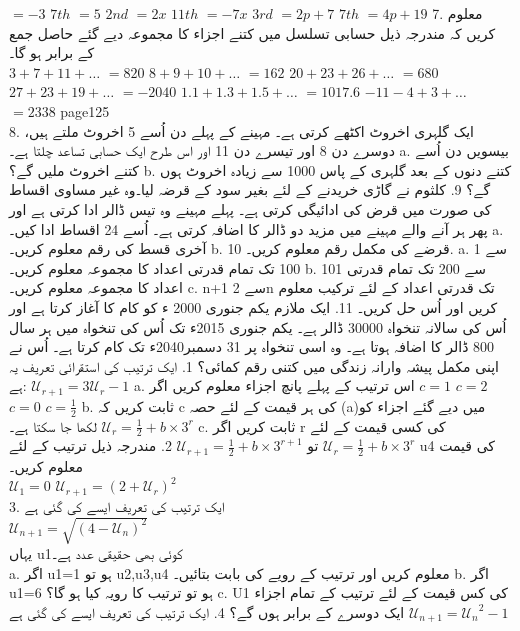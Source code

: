 \(=-3\)
\(7th\)
\(=5\)
\(2nd\)
\(=2x\)
\(11th\)
\(=-7x\)
\(3rd\)
\(=2p+7\)
\(7th\)
\(=4p+19\)
7.	معلوم کریں کہ مندرجہ ذیل حسابی تسلسل میں کتنے اجزاء کا مجموعہ دیے گئے حاصل جمع کے برابر ہو گا۔\\
\(3+7+11+\dotsc\)
\(=820\)
\(8+9+10+\dotsc\)
\(=162\)
\(20+23+26+\dotsc\)
\(=680\)
\(27+23+19+\dotsc\)
\(=-2040\)
\(1.1+1.3+1.5+\dotsc\)
\(=1017.6\)
\(-11-4+3+\dotsc\)
\(=2338\)
\clearpage
page125\\
8.	ایک گلہری اخروٹ اکٹھے کرتی ہے۔ مہینے کے پہلے دن اُسے 5 اخروٹ ملتے ہیں، دوسرے دن 8 اور تیسرے دن 11 اور اس طرح ایک حسابی تساعد چلتا ہے۔
a.	بیسویں دن اُسے کتنے اخروٹ ملیں گے؟
b.	کتنے دنوں کے بعد گلہری کے پاس 1000 سے زیادہ اخروٹ ہوں گے؟
9.	کلثوم نے گاڑی خریدنے کے لئے بغیر سود کے قرضہ لیا۔وہ غیر مساوی اقساط کی صورت میں قرض کی ادائیگی کرتی ہے۔ پہلے مہینے وہ تیس ڈالر ادا کرتی ہے اور پھر ہر آنے والے مہینے میں مزید دو ڈالر کا اضافہ کرتی ہے۔ اُسے 24 اقساط ادا کیں۔
a.	آخری قسط کی رقم معلوم کریں۔
b.	قرضے کی مکمل رقم معلوم کریں۔
10.	
a.	1 سے 100 تک تمام قدرتی اعداد کا مجموعہ معلوم کریں۔
b.	101 سے 200 تک تمام قدرتی اعداد کا مجموعہ معلوم کریں۔
c.	n+1 سے 2n تک قدرتی اعداد کے لئے ترکیب معلوم کریں اور اُس حل کریں۔
11.	ایک ملازم یکم جنوری 2000 ء کو کام کا آغاز کرتا ہے اور اُس کی سالانہ تنخواہ 30000 ڈالر ہے۔ یکم جنوری 2015ء تک اُس کی تنخواہ میں ہر سال 800 ڈالر کا اضافہ ہوتا ہے۔ وہ اسی تنخواہ پر 31 دسمبر2040ء تک کام کرتا ہے۔ اُس نے اپنی مکمل پیشہ وارانہ زندگی میں کتنی رقم کمائی؟
1.	ایک ترتیب کی استقرائی تعریف یہ ہے:
\(\mathcal {U}_{r+1}=3\mathcal{U}_r-1\)
a.
اس ترتیب کے پہلے پانچ اجزاء معلوم کریں اگر
\(c=1\)
\(c=2\)
\(c=0\)
\(c=\frac{1}{2}\)
b.
ثابت کریں کہ c کی ہر قیمت کے لئے حصہ (a)میں دیے گئے اجزاء کو
\(\mathcal{U}_r=\frac{1}{2}+b\times3^r\)
  لکھا جا سکتا ہے۔
c.
ثابت کریں اگر r کی کسی قیمت کے لئے
\(\mathcal{U}_r=\frac{1}{2}+b\times3^r\)
تو
\(\mathcal{U}_{r+1}=\frac{1}{2}+b\times3^{r+1}\)
2.	مندرجہ ذیل ترتیب کے لئے u4 کی قیمت معلوم کریں۔\\
\(\mathcal{U}_1=0\)
\(\mathcal{U}_{r+1}=(2+\mathcal{U}_r)^2\)\\
3.	ایک ترتیب کی تعریف ایسے کی گئی ہے\\
\(\mathcal{U}_{n+1}=\sqrt{({4}-{\mathcal{U}_n})^2}\)\\
یہاں  u1کوئی بھی حقیقی عدد ہے۔\\
a.	اگر u1=1 ہو تو u2,u3,u4 معلوم کریں اور ترتیب کے رویے کی بابت بتائیں۔
b.	اگر u1=6 ہو تو ترتیب کا رویہ کیا ہو گا؟
c.	U1 کی کس قیمت کے لئے ترتیب کے تمام اجزاء ایک دوسرے کے برابر ہوں گے؟
4.	ایک ترتیب کی تعریف ایسے کی گئی ہے
\(\mathcal{U}_{n+1}={\mathcal{U}_n}^2 -1\)\\
